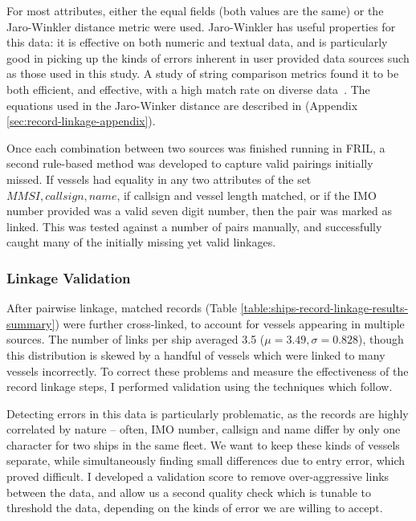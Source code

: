 For most attributes, either the equal fields (both values are the same) or the Jaro-Winkler distance metric were used. Jaro-Winkler has useful properties for this data: it is effective on both numeric and textual data, and is particularly good in picking up the kinds of errors inherent in user provided data sources such as those used in this study. A study of string comparison metrics found it to be both efficient, and effective, with a high match rate on diverse data~\citep{Cohen2003}. The equations used in the Jaro-Winker distance are described in (Appendix \ref{sec:record-linkage-appendix}).

Once each combination between two sources was finished running in FRIL, a second rule-based method was developed to capture valid pairings initially missed. If vessels had equality in any two attributes of the set ${MMSI, callsign, name}$, if callsign and vessel length matched, or if the IMO number provided was a valid seven digit number, then the pair was marked as linked. This was tested against a number of pairs manually, and successfully caught many of the initially missing yet valid linkages.

\subsubsection{Linkage Validation}

After pairwise linkage, matched records (Table \ref{table:ships-record-linkage-results-summary}) were further cross-linked, %
 to account for vessels appearing in multiple sources. The number of links per ship averaged 3.5 ($\mu = 3.49, \sigma = 0.828$), %
though this distribution is skewed by a handful of vessels which were linked to many vessels incorrectly. To correct these problems and measure the effectiveness of the record linkage steps, I performed validation using the techniques which follow.

Detecting errors in this data is particularly problematic, as the records are highly correlated by nature -- often, IMO number, callsign and name differ by only one character for two ships in the same fleet. We want to keep these kinds of vessels separate, while simultaneously finding small differences due to entry error, which proved difficult. I developed a validation score to remove over-aggressive links between the data, and allow us a second quality check which is tunable to threshold the data, depending on the kinds of error we are willing to accept.

